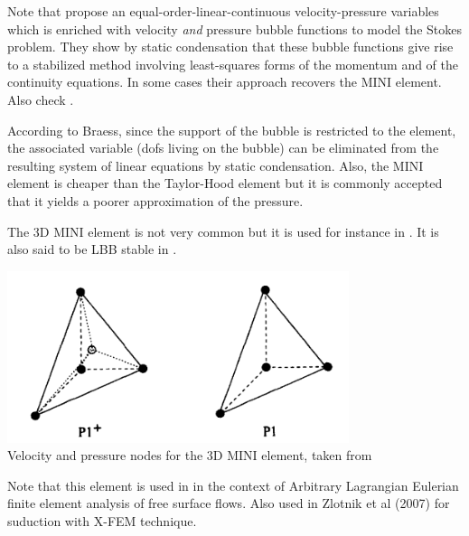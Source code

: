 \begin{remark}
Note that \cite{frol03} propose an equal-order-linear-continuous velocity-pressure variables which is enriched 
with velocity {\it and} pressure bubble functions to model the Stokes problem. They show by static condensation that
these bubble functions give rise to a stabilized method involving least-squares forms of the momentum and of the
continuity equations. In some cases their approach recovers the MINI element. Also check \cite{gamt08}.
\end{remark}

\begin{remark}
According to Braess\cite{braess}, since the support of the bubble is restricted to the element, 
the associated variable (dofs living on the bubble) can be eliminated from the resulting 
system of linear equations by static condensation. 
Also, the MINI element is cheaper than the Taylor-Hood element but it is commonly accepted
that it yields a poorer approximation of the pressure.
\end{remark}

The 3D MINI element is not very common but it is used for instance in \cite{pico98}.
It is also said to be LBB stable in \cite[p180]{reddybook2}.

\begin{center}
\includegraphics[width=10cm]{images/mini/mini3D}\\
{\captionfont Velocity and pressure nodes for the 3D MINI element, taken from \cite{pico98}}
\end{center}

Note that this element is used in \cite{brwr00} in the context of Arbitrary Lagrangian Eulerian 
finite element analysis of free surface flows.
Also used in Zlotnik et al (2007) \cite{zldf07} for suduction with X-FEM technique.







